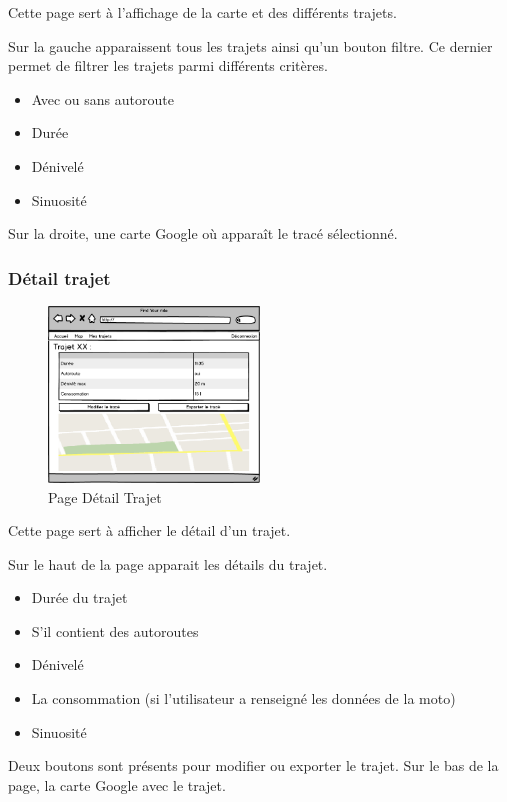 \documentclass[a4paper]{article}
\begin{document}
Cette page sert à l'affichage de la carte et des différents trajets.

Sur la gauche apparaissent tous les trajets ainsi qu'un bouton filtre.
Ce dernier permet de filtrer les trajets parmi différents critères.
\begin{itemize}
    \item Avec ou sans autoroute
    \item Durée
    \item Dénivelé
    \item Sinuosité
\end{itemize}
Sur la droite, une carte Google où apparaît le tracé sélectionné.

\subsubsection{Détail trajet}
\begin{figure}[h]
\centering
\includegraphics[width=0.5\textwidth]{./Images/Interfaces/DetailTrajet.png}
\caption{Page Détail Trajet}
\end{figure}

Cette page sert à afficher le détail d'un trajet.

Sur le haut de la page apparait les détails du trajet.
\begin{itemize}
    \item Durée du trajet
    \item S'il contient des autoroutes
    \item Dénivelé
    \item La consommation (si l'utilisateur a renseigné les données de la moto)
    \item Sinuosité
\end{itemize}
Deux boutons sont présents pour modifier ou exporter le trajet.
Sur le bas de la page, la carte Google avec le trajet.
\end{document}
